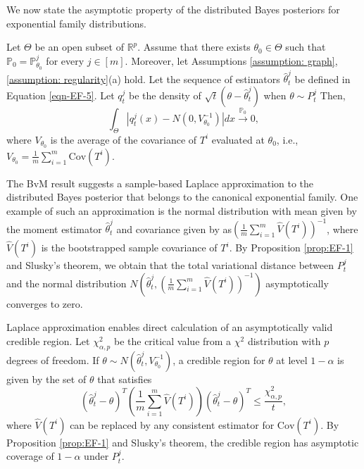 \documentclass[twoside,11pt]{article}
\numberwithin{equation}{section}
\newcommand{\R}{{\mathbb{R}}}
\newcommand\bP{\mathbb{P}}
\newcommand{\pto}{\stackrel{\bP_0}{\to}}
\begin{document}
{We now state the asymptotic property of the distributed Bayes posteriors for exponential family distributions.  
\begin{proposition} \label{prop:EF-1}
Let $\Theta$ be an open subset of $\R^p$. Assume that there exists $\theta_0 \in \Theta$ such that $\bP_0 = \bP_{\theta_0}^j$ for every $j \in [m]$. Moreover, let Assumptions \ref{assumption: graph}, \ref{assumption: regularity}(a) hold. Let the sequence of estimators $\hat \theta_t^j$ be defined in Equation \eqref{eqn-EF-5}. Let $q_t^j$ be the density of $\sqrt{t}(\theta -\hat \theta_t^j)$ when $\theta \sim P_t^j$ Then, 
\begin{equation*}
    \int_\Theta |q_t^j(x) - N(0, V_{\theta_0}^{-1})| dx \pto 0, 
\end{equation*}
where $V_{\theta_0}$ is the average of the covariance of $T^i$ evaluated at $\theta_0$, i.e., $V_{\theta_0} = \frac{1}{m} \sum_{i = 1}^m \text{Cov}(T^i)$.  
\end{proposition}
The BvM result suggests a sample-based Laplace approximation to the distributed Bayes posterior that belongs to the canonical exponential family. One example of such an approximation is the normal distribution with mean given by the moment estimator $\hat{\theta}_{t}^j$ and covariance given by as$\left(\frac{1}{m} \sum_{i=1}^{m} \hat V(T^{i})\right)^{-1}$, where $\hat V(T^{i})$ is the bootstrapped sample covariance of $T^{i}$. By Proposition \ref{prop:EF-1} and Slusky's theorem, we obtain that the total variational distance between $P_{t}^j$ and the normal distribution $N\left(\hat{\theta}_{t}^j, \left(\frac{1}{m} \sum_{i=1}^{m} \hat V(T^{i})\right)^{-1}\right)$ asymptotically converges to zero.

 Laplace approximation enables direct calculation of an asymptotically valid credible region.  Let $\chi_{\alpha, p}^2$ be the critical value from a $\chi^2$ distribution with $p$ degrees of freedom.  If $\theta \sim N\left(\hat{\theta}_{t}^j, V_{\theta_0}^{-1}\right)$, a credible region for $\theta$ at level $1 - \alpha$ is given by the set of $\theta$ that satisfies
\begin{equation*}
    (\hat{\theta}_{t}^j - \theta)^T \left(\frac{1}{m} \sum_{i=1}^{m} \hat V(T^{i})\right)  (\hat{\theta}_{t}^j - \theta)^T \leq \frac{\chi_{\alpha, p}^2}{t}, 
\end{equation*}
where $\hat V(T^{i})$ can be replaced by any consistent estimator for $\text{Cov}(T^i)$. By Proposition \ref{prop:EF-1} and Slusky's theorem, the credible region has asymptotic coverage of $1 - \alpha$ under $P_t^j$. 

}
\end{document}
